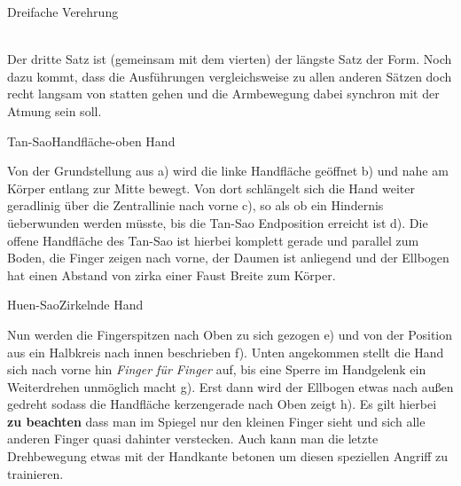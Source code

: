 \begin{WTSatz}{Dreifache Verehrung}%
	
	\vspace{4px} %
	\\ 
	Der dritte Satz ist (gemeinsam mit dem vierten) der l\"angste Satz der Form. Noch dazu kommt, dass die Ausf\"uhrungen vergleichsweise zu allen anderen S\"atzen doch recht langsam von statten gehen und die Armbewegung dabei synchron mit der Atmung sein soll.
	

	\begin{WTSatzTeil}{Tan-Sao}{Handfl\"ache-oben Hand}
		
		Von der Grundstellung aus a) wird die linke Handfl\"ache ge\"offnet b) und nahe am K\"orper entlang zur Mitte bewegt. Von dort schl\"angelt sich die Hand weiter geradlinig \"uber die Zentrallinie nach vorne c), so als ob ein Hindernis \"ueberwunden werden m\"usste, bis die Tan-Sao Endposition erreicht ist d). Die offene Handfl\"ache des Tan-Sao ist hierbei komplett gerade und parallel zum Boden, die Finger zeigen nach vorne, der Daumen ist anliegend und der Ellbogen hat einen Abstand von zirka einer Faust Breite zum K\"orper. %
		
	\end{WTSatzTeil}
	\begin{WTSatzTeil}{Huen-Sao}{Zirkelnde Hand}
		
		Nun werden die Fingerspitzen nach Oben zu sich gezogen e) und von der Position aus ein Halbkreis nach innen beschrieben f). Unten angekommen stellt die Hand sich nach vorne hin \textit{Finger f\"ur Finger} auf, bis eine Sperre im Handgelenk ein Weiterdrehen unm\"oglich macht g). Erst dann wird der Ellbogen etwas nach au{\ss}en gedreht sodass die Handfl\"ache kerzengerade nach Oben zeigt h). Es gilt hierbei \textbf{zu beachten} dass man im Spiegel nur den kleinen Finger sieht und sich alle anderen Finger quasi dahinter verstecken. Auch kann man die letzte Drehbewegung etwas mit der Handkante betonen um diesen speziellen Angriff zu trainieren.
		

\end{WTSatzTeil}
\end{WTSatz}

